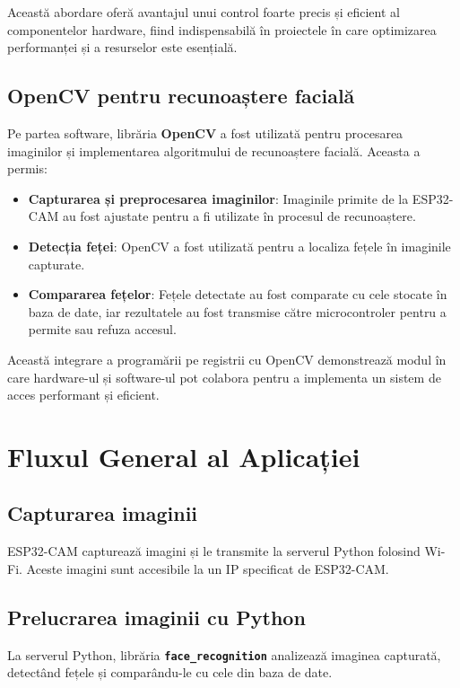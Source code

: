 \documentclass[a4paper,12pt]{report}
\begin{document}
Această abordare oferă avantajul unui control foarte precis și eficient al componentelor hardware, fiind indispensabilă în proiectele în care optimizarea performanței și a resurselor este esențială.

\subsection*{OpenCV pentru recunoaștere facială}

Pe partea software, librăria \textbf{OpenCV} a fost utilizată pentru procesarea imaginilor și implementarea algoritmului de recunoaștere facială. Aceasta a permis:
\begin{itemize}
    \item \textbf{Capturarea și preprocesarea imaginilor}: Imaginile primite de la ESP32-CAM au fost ajustate pentru a fi utilizate în procesul de recunoaștere.
    \item \textbf{Detecția feței}: OpenCV a fost utilizată pentru a localiza fețele în imaginile capturate.
    \item \textbf{Compararea fețelor}: Fețele detectate au fost comparate cu cele stocate în baza de date, iar rezultatele au fost transmise către microcontroler pentru a permite sau refuza accesul.
\end{itemize}

Această integrare a programării pe registrii cu OpenCV demonstrează modul în care hardware-ul și software-ul pot colabora pentru a implementa un sistem de acces performant și eficient.

\section{Fluxul General al Aplicației}


\subsection{Capturarea imaginii}
ESP32-CAM capturează imagini și le transmite la serverul Python folosind Wi-Fi. Aceste imagini sunt accesibile la un IP specificat de ESP32-CAM.

\subsection{Prelucrarea imaginii cu Python}
La serverul Python, librăria \texttt{\textbf{face\_recognition}} analizează imaginea capturată, detectând fețele și comparându-le cu cele din baza de date.
\end{document}
